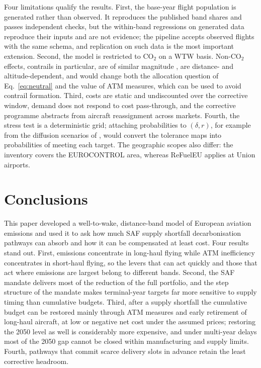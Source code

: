 \documentclass[preprint, 12pt, authoryear]{elsarticle}
\begin{document}
Four limitations qualify the results. First, the base-year flight population is
generated rather than observed. It reproduces the published band shares and
passes independent checks, but the within-band regressions on generated data
reproduce their inputs and are not evidence; the pipeline accepts observed
flights with the same schema, and replication on such data is the most important
extension. Second, the model is restricted to CO$_2$ on a WTW basis. Non-CO$_2$
effects, contrails in particular, are of similar magnitude
\citep{lee2021}, are distance- and altitude-dependent, and would change both the
allocation question of Eq.~\eqref{eq:neutral} and the value of ATM measures,
which can be used to avoid contrail formation. Third, costs are static and
undiscounted over the corrective window, demand does not respond to cost
pass-through, and the corrective programme abstracts from aircraft reassignment
across markets. Fourth, the stress test is a deterministic grid; attaching
probabilities to $(\delta, r)$, for example from the diffusion scenarios of
\citet{martulli2025}, would convert the tolerance maps into probabilities of
meeting each target. The geographic scopes also differ: the inventory covers the
EUROCONTROL area, whereas ReFuelEU applies at Union airports.

\section{Conclusions}
\label{sec:conclusions}

This paper developed a well-to-wake, distance-band model of European aviation
emissions and used it to ask how much SAF supply shortfall decarbonisation
pathways can absorb and how it can be compensated at least cost. Four results
stand out. First, emissions concentrate in long-haul flying while ATM
inefficiency concentrates in short-haul flying, so the levers that can act
quickly and those that act where emissions are largest belong to different
bands. Second, the SAF mandate delivers most of the reduction of the full
portfolio, and the step structure of the mandate makes terminal-year targets far more
sensitive to supply timing than cumulative budgets. Third, after a supply
shortfall the cumulative budget can be restored mainly through ATM measures and
early retirement of long-haul aircraft, at low or negative net cost under the
assumed prices; restoring the 2050 level as well is considerably more expensive,
and under multi-year delays most of the 2050 gap cannot be closed within
manufacturing and supply limits.
Fourth, pathways that commit scarce delivery slots in advance retain the least
corrective headroom.
\end{document}
